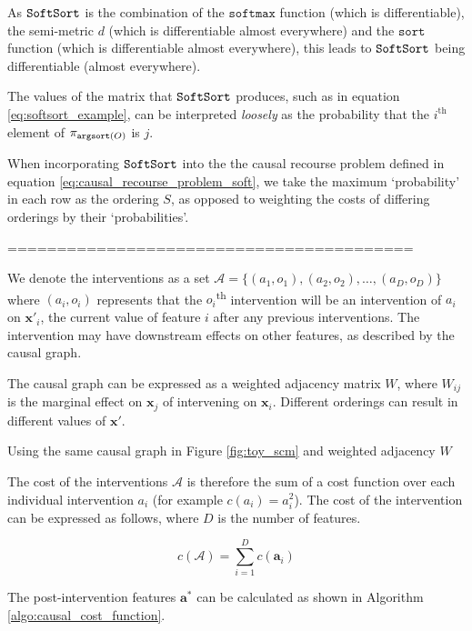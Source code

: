 As $\operatorname*{\texttt{SoftSort}}$ is the combination of the $\texttt{softmax}$ function (which is differentiable), the semi-metric $d$ (which is differentiable almost everywhere) and the $\texttt{sort}$ function (which is differentiable almost everywhere), this leads to $\operatorname*{\texttt{SoftSort}}$ being differentiable (almost everywhere).

The values of the matrix that $\operatorname*{\texttt{SoftSort}}$ produces, such as in equation \ref{eq:softsort_example}, can be interpreted \textit{loosely} as the probability that the $i^{\text{th}}$ element of $\pi_{\operatorname*{\texttt{argsort}}(O)}$ is $j$.

When incorporating $\operatorname*{\texttt{SoftSort}}$ into the the causal recourse problem defined in equation \ref{eq:causal_recourse_problem_soft}, we take the maximum `probability' in each row as the ordering $S$, as opposed to weighting the costs of differing orderings by their `probabilities'.


=========================================


We denote the interventions as a set $\mathcal{A} = \{(a_1, o_1), (a_2, o_2), \ldots, (a_D, o_D)\}$ where $(a_i, o_i)$ represents that the $o_i$\textsuperscript{th} intervention will be an intervention of $a_i$ on $\mathbf{x}'_i$, the current value of feature $i$ after any previous interventions. The intervention may have downstream effects on other features, as described by the causal graph.


The causal graph can be expressed as a weighted adjacency matrix $W$, where $W_{ij}$ is the marginal effect on $\mathbf{x}_j$ of intervening on $\mathbf{x}_i$. Different orderings can result in different values of $\mathbf{x}'$.

Using the same causal graph in Figure \ref{fig:toy_scm} and weighted adjacency $W$ 

The cost of the interventions $\mathcal{A}$ is therefore the sum of a cost function over each individual intervention $a_i$ (for example $c(a_i) = a_i^2$). The cost of the intervention can be expressed as follows, where $D$ is the number of features. 

\begin{equation}
	c(\mathcal{A}) = \sum_{i=1}^D c(\mathbf{a}_i)
\end{equation}

The post-intervention features $\mathbf{a}^*$ can be calculated as shown in Algorithm \ref{algo:causal_cost_function}.

